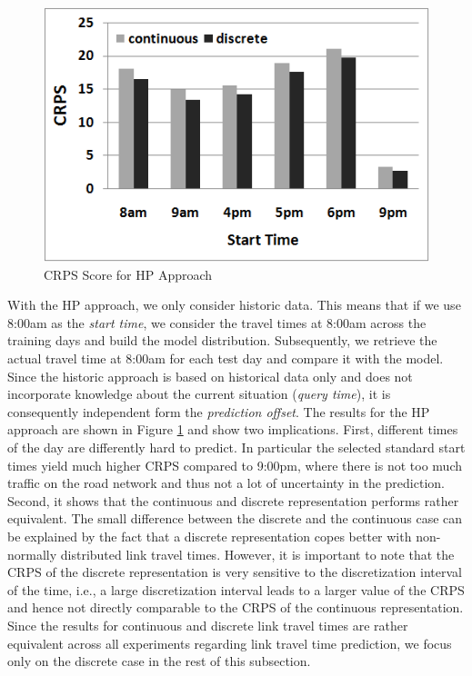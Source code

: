 \begin{figure}[h]
	\centering
	\includegraphics[width = 0.65\columnwidth]{figures/HP_results.png}
			\vspace{-0.2cm}
	\caption{CRPS Score for HP Approach}\label{fig:HP_results}
			\vspace{-0.2cm}
\end{figure}

With the HP approach, we only consider historic data. This means that if we use 8:00am as the \textit{start time}, we consider the travel times at 8:00am across the training days and build the model distribution. Subsequently, we retrieve the actual travel time at 8:00am for each test day and compare it with the model. Since the historic approach is based on historical data only and does not incorporate knowledge about the current situation (\textit{query time}), it is consequently independent form the \textit{prediction offset}. The results for the HP approach are shown in Figure \ref{fig:HP_results} and show two implications. First, different times of the day are differently hard to predict. In particular the selected standard start times yield much higher CRPS compared to 9:00pm, where there is not too much traffic on the road network and thus not a lot of uncertainty in the prediction.  Second, it shows that the continuous and discrete representation performs rather equivalent. The small difference between the discrete and the continuous case can be explained by the fact that a discrete representation copes better with non-normally distributed link travel times. However, it is important to note that the CRPS of the discrete representation is very sensitive to the discretization interval of the time, i.e., a large discretization interval leads to a larger value of the CRPS and hence not directly comparable to the CRPS of the continuous representation.
Since the results for continuous and discrete link travel times are rather
equivalent across all experiments regarding link travel time prediction, we focus only on the discrete case in the rest of this subsection.


